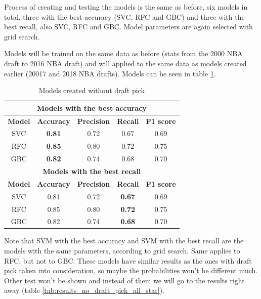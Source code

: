 \documentclass[a4paper]{article}
\begin{document}
Process of creating and testing the models is the same as before, six models in total, three with the best accuracy (SVC, RFC and GBC) and three with the best recall, also SVC, RFC and GBC. Model parameters are again selected with grid search.

Models will be trained on the same data as before (stats from the 2000 NBA draft to 2016 NBA draft) and will applied to the same data as models created earlier (20017 and 2018 NBA drafts). Models can be seen in table \ref{tab:models_no_draft_pick_all_star}.

\begin{table}[!h]
\begin{center}
\begin{tabular}{|c|c|c|c|c|} \hline
\multicolumn{5}{|c|}{\textbf{Models with the best accuracy}} \\ \hline
\textbf{Model} & \textbf{Accuracy} & \textbf{Precision} & \textbf{Recall} & \textbf{F1 score} \\ \hline
SVC & \textbf{0.81} & 0.72 & 0.67 & 0.69 \\ \hline
RFC & \textbf{0.85} & 0.80 & 0.72 & 0.75 \\ \hline
GBC & \textbf{0.82} & 0.74 & 0.68 & 0.70 \\ \hline
\multicolumn{5}{|c|}{\textbf{Models with the best recall}} \\ \hline
\textbf{Model} & \textbf{Accuracy} & \textbf{Precision} & \textbf{Recall} & \textbf{F1 score} \\ \hline
SVC & 0.81 & 0.72 & \textbf{0.67} & 0.69 \\ \hline
RFC & 0.85 & 0.80 & \textbf{0.72} & 0.75 \\ \hline
GBC & 0.82 & 0.74 & \textbf{0.68} & 0.70 \\ \hline
\end{tabular}
\caption{Models created without draft pick}
\label{tab:models_no_draft_pick_all_star}
\end{center}
\end{table}

Note that SVM with the best accuracy and SVM with the best recall are the models with the same parameters, according to grid search. Same applies to RFC, but not to GBC. These models have similar results as the ones with draft pick taken into consideration, so maybe the probabilities won't be different much. Other test won't be shown and instead of them we will go to the results right away (table \ref{tab:results_no_draft_pick_all_star}).
\end{document}
